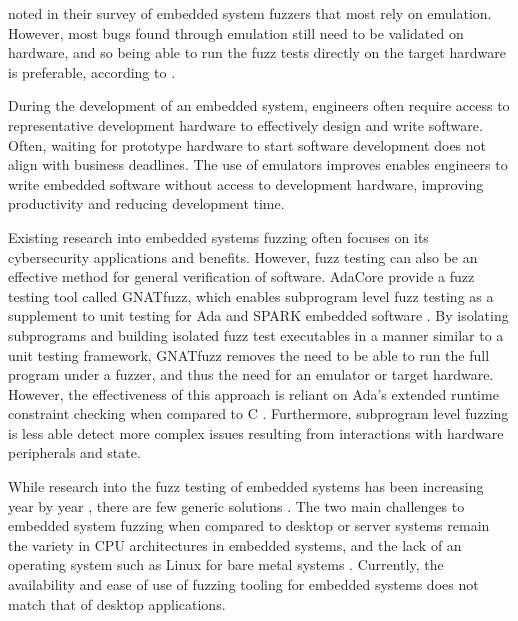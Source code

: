 \documentclass[../report.tex]{subfiles}
\begin{document}
\citet{Yun_2022} noted in their survey of embedded system fuzzers that most
rely on emulation. However, most bugs found through emulation still need to be
validated on hardware, and so being able to run the fuzz tests directly on the
target hardware is preferable, according to \citet{Eisele_et_al_2022}.

During the development of an embedded system, engineers often require access to
representative development hardware to effectively design and write software.
Often, waiting for prototype hardware to start software development does not
align with business deadlines. The use of emulators improves enables engineers
to write embedded software without access to development hardware, improving
productivity and reducing development time.

Existing research into embedded systems fuzzing often focuses on its
cybersecurity applications and benefits. However, fuzz testing can also be an
effective method for general verification of software. AdaCore provide a fuzz
testing tool called GNATfuzz, which enables subprogram level fuzz testing as a
supplement to unit testing for Ada and SPARK embedded software
\citep{gnatfuzz}. By isolating subprograms and building isolated fuzz test
executables in a manner similar to a unit testing framework, GNATfuzz removes
the need to be able to run the full program under a fuzzer, and thus the need
for an emulator or target hardware. However, the effectiveness of this approach
is reliant on Ada's extended runtime constraint checking when compared to C
\citep{gnatfuzz}. Furthermore, subprogram level fuzzing is less able detect
more complex issues resulting from interactions with hardware peripherals and
state.

While research into the fuzz testing of embedded systems has been increasing
year by year \citep{Yun_2022}, there are few generic solutions
\citep{Eisele_et_al_2022}. The two main challenges to embedded system fuzzing
when compared to desktop or server systems remain the variety in CPU
architectures in embedded systems, and the lack of an operating system such as
Linux for bare metal systems \citep{Eisele_et_al_2022}. Currently, the
availability and ease of use of fuzzing tooling for embedded systems does not
match that of desktop applications.
\end{document}
